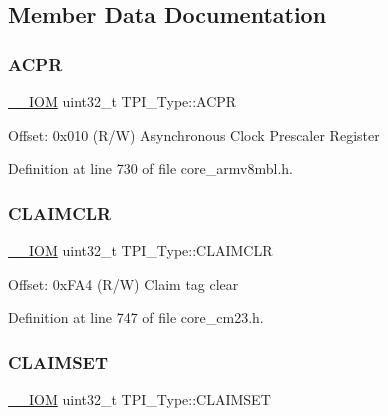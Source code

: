 \subsection{Member Data Documentation}
\mbox{\label{struct_t_p_i___type_a9e5e4421ef9c3d5b7ff8b24abd4e99b3}} 
\subsubsection{\texorpdfstring{A\+C\+PR}{ACPR}}
{\footnotesize\ttfamily \hyperlink{core__sc300_8h_ab6caba5853a60a17e8e04499b52bf691}{\+\_\+\+\_\+\+I\+OM} uint32\+\_\+t T\+P\+I\+\_\+\+Type\+::\+A\+C\+PR}

Offset\+: 0x010 (R/W) Asynchronous Clock Prescaler Register 

Definition at line 730 of file core\+\_\+armv8mbl.\+h.

\mbox{\label{struct_t_p_i___type_a0e10e292cb019a832b03ddd055b2f6ac}} 
\subsubsection{\texorpdfstring{C\+L\+A\+I\+M\+C\+LR}{CLAIMCLR}}
{\footnotesize\ttfamily \hyperlink{core__sc300_8h_ab6caba5853a60a17e8e04499b52bf691}{\+\_\+\+\_\+\+I\+OM} uint32\+\_\+t T\+P\+I\+\_\+\+Type\+::\+C\+L\+A\+I\+M\+C\+LR}

Offset\+: 0x\+F\+A4 (R/W) Claim tag clear 

Definition at line 747 of file core\+\_\+cm23.\+h.

\mbox{\label{struct_t_p_i___type_af8b7d15fa5252b733dd4b11fa1b5730a}} 
\subsubsection{\texorpdfstring{C\+L\+A\+I\+M\+S\+ET}{CLAIMSET}}
{\footnotesize\ttfamily \hyperlink{core__sc300_8h_ab6caba5853a60a17e8e04499b52bf691}{\+\_\+\+\_\+\+I\+OM} uint32\+\_\+t T\+P\+I\+\_\+\+Type\+::\+C\+L\+A\+I\+M\+S\+ET}


